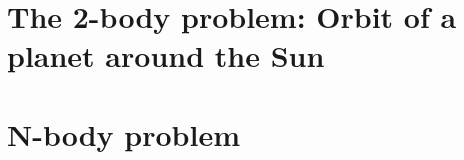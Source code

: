 \documentclass[11 pt]{article}
\begin{document}
    \section{The 2-body problem: Orbit of a planet around the Sun}
        

    \clearpage
    \section{N-body problem}
        
\end{document}
